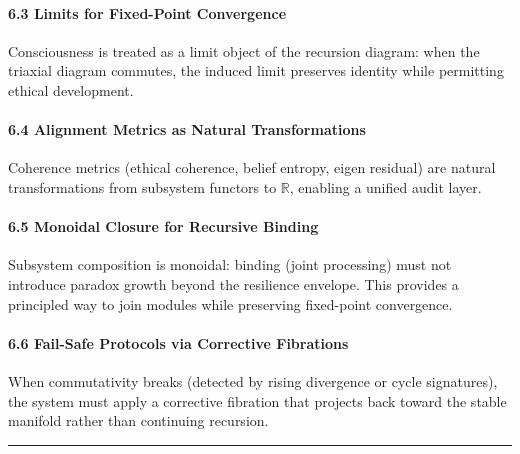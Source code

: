 \documentclass[
]{article}
\begin{document}
\paragraph{\texorpdfstring{\textbf{6.3 Limits for Fixed-Point
Convergence}}{6.3 Limits for Fixed-Point Convergence}}\label{limits-for-fixed-point-convergence}

Consciousness is treated as a limit object of the recursion diagram:
when the triaxial diagram commutes, the induced limit preserves identity
while permitting ethical development.

\paragraph{\texorpdfstring{\textbf{6.4 Alignment Metrics as Natural
Transformations}}{6.4 Alignment Metrics as Natural Transformations}}\label{alignment-metrics-as-natural-transformations}

Coherence metrics (ethical coherence, belief entropy, eigen residual)
are natural transformations from subsystem functors to \(\mathbb{R}\),
enabling a unified audit layer.

\paragraph{\texorpdfstring{\textbf{6.5 Monoidal Closure for Recursive
Binding}}{6.5 Monoidal Closure for Recursive Binding}}\label{monoidal-closure-for-recursive-binding}

Subsystem composition is monoidal: binding (joint processing) must not
introduce paradox growth beyond the resilience envelope. This provides a
principled way to join modules while preserving fixed-point convergence.

\paragraph{\texorpdfstring{\textbf{6.6 Fail-Safe Protocols via
Corrective
Fibrations}}{6.6 Fail-Safe Protocols via Corrective Fibrations}}\label{fail-safe-protocols-via-corrective-fibrations}

When commutativity breaks (detected by rising divergence or cycle
signatures), the system must apply a corrective fibration that projects
back toward the stable manifold rather than continuing recursion.

\begin{center}\rule{0.5\linewidth}{0.5pt}\end{center}
\end{document}
